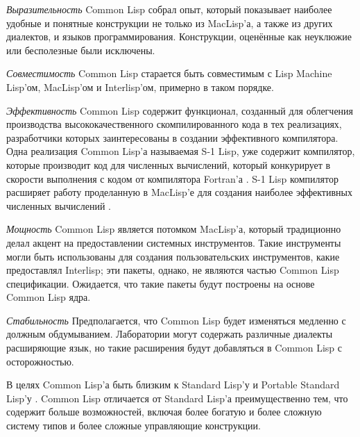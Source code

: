 \begin{flushdesc}
\item[\emph{Выразительность}]
Common Lisp собрал опыт, который показывает наиболее удобные и
понятные конструкции не только из MacLisp'а, а также из других
диалектов, и языков программирования. Конструкции, оценённые как
неуклюжие или бесполезные были исключены.

\item[\emph{Совместимость}]
Common Lisp старается быть совместимым с Lisp Machine Lisp'ом,
MacLisp'ом и Interlisp'ом, примерно в таком порядке.

\item[\emph{Эффективность}]
Common Lisp содержит функционал, созданный для облегчения
производства высококачественного скомпилированного кода в тех
реализациях, разработчики которых заинтересованы в создании
эффективного компилятора. Одна реализация Common Lisp'а называемая
S-1 Lisp, уже содержит компилятор, которые производит код для
численных вычислений, который конкурирует в скорости выполнения
с кодом от компилятора Fortran'а \cite{S1-COMPILER}. S-1 Lisp
компилятор расширяет работу проделанную в MacLisp'е для создания
наиболее эффективных численных вычислений \cite{MACLISP-BEATS-FORTRAN}.

\item[\emph{Мощность}]
Common Lisp является потомком MacLisp'а, который традиционно делал
акцент на предоставлении системных инструментов. Такие инструменты
могли быть использованы для создания пользовательских
инструментов, какие предоставлял Interlisp; эти пакеты, однако, не
являются частью Common Lisp спецификации. Ожидается, что
такие пакеты будут построены на основе Common Lisp ядра.

\item[\emph{Стабильность}]
Предполагается, что Common Lisp будет изменяться медленно с
должным обдумыванием. Лаборатории могут содержать различные диалекты расширяющие
язык, но такие расширения будут добавляться в Common Lisp с осторожностью.
\end{flushdesc}

В целях Common Lisp'а быть близким к Standard Lisp'у \cite{STANDARD-LISP-REPORT}
и Portable Standard Lisp'у \cite{PSL-MANUAL}. Common Lisp отличается от Standard
Lisp'а преимущественно тем, что содержит больше возможностей, включая более
богатую и более сложную систему типов и более сложные управляющие конструкции. 

